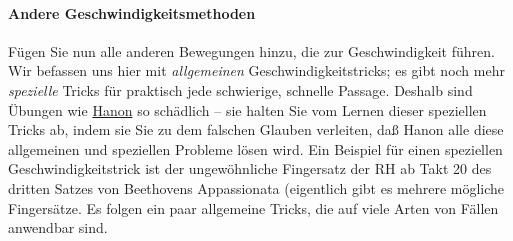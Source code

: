 \paragraph{Andere Geschwindigkeitsmethoden}
\label{c1iii7iAndere}

Fügen Sie nun alle anderen Bewegungen hinzu, die zur Geschwindigkeit führen.
Wir befassen uns hier mit \textit{allgemeinen} Geschwindigkeitstricks; es gibt noch mehr \textit{spezielle} Tricks für praktisch jede schwierige, schnelle Passage.
Deshalb sind Übungen wie \hyperref[c1iii7h]{Hanon} so schädlich -- sie halten Sie vom Lernen dieser speziellen Tricks ab, indem sie Sie zu dem falschen Glauben verleiten, daß Hanon alle diese allgemeinen und speziellen Probleme lösen wird.
Ein Beispiel für einen speziellen Geschwindigkeitstrick ist der ungewöhnliche Fingersatz der RH ab Takt 20 des dritten Satzes von Beethovens Appassionata (eigentlich gibt es mehrere mögliche Fingersätze.
Es folgen ein paar allgemeine Tricks, die auf viele Arten von Fällen anwendbar sind.

